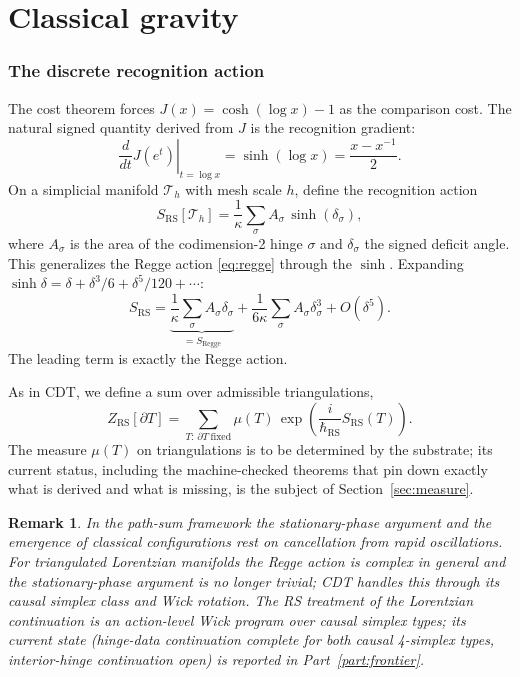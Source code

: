 \documentclass[11pt,letterpaper]{article}
\newtheorem{remark}[theorem]{Remark}
\begin{document}
\part{Classical gravity}
\label{part:classical}

\section{The discrete recognition action}
\label{sec:action}

The cost theorem forces $J(x)=\cosh(\log x)-1$ as the comparison cost. The natural signed quantity derived from $J$ is the recognition gradient:
\begin{equation}
\left.\frac{d}{dt}J(e^{t})\right|_{t=\log x}=\sinh(\log x)=\frac{x-x^{-1}}{2}.
\label{eq:gradient}
\end{equation}
On a simplicial manifold $\mathcal{T}_{h}$ with mesh scale $h$, define the recognition action
\begin{equation}
S_{\mathrm{RS}}[\mathcal{T}_{h}]=\frac{1}{\kappa}\sum_{\sigma}A_{\sigma}\,\sinh(\delta_{\sigma}),
\label{eq:rsaction}
\end{equation}
where $A_{\sigma}$ is the area of the codimension-2 hinge $\sigma$ and $\delta_{\sigma}$ the signed deficit angle. This generalizes the Regge action \eqref{eq:regge} through the $\sinh$. Expanding $\sinh\delta=\delta+\delta^{3}/6+\delta^{5}/120+\cdots$:
\begin{equation}
S_{\mathrm{RS}}=\underbrace{\frac{1}{\kappa}\sum_{\sigma}A_{\sigma}\delta_{\sigma}}_{=S_{\mathrm{Regge}}}+\frac{1}{6\kappa}\sum_{\sigma}A_{\sigma}\delta_{\sigma}^{3}+O(\delta^{5}).
\label{eq:sinhexp}
\end{equation}
The leading term is exactly the Regge action.

As in CDT, we define a sum over admissible triangulations,
\begin{equation}
Z_{\mathrm{RS}}[\partial T]=\sum_{T:\,\partial T\ \text{fixed}}\mu(T)\,\exp\!\left(\frac{i}{\hbar_{\mathrm{RS}}}S_{\mathrm{RS}}(T)\right).
\label{eq:pathsum}
\end{equation}
The measure $\mu(T)$ on triangulations is to be determined by the substrate; its current status, including the machine-checked theorems that pin down exactly what is derived and what is missing, is the subject of Section~\ref{sec:measure}.

\begin{remark}
In the path-sum framework the stationary-phase argument and the emergence of classical configurations rest on cancellation from rapid oscillations. For triangulated Lorentzian manifolds the Regge action is complex in general and the stationary-phase argument is no longer trivial; CDT handles this through its causal simplex class and Wick rotation. The RS treatment of the Lorentzian continuation is an action-level Wick program over causal simplex types; its current state (hinge-data continuation complete for both causal 4-simplex types, interior-hinge continuation open) is reported in Part~\ref{part:frontier}.
\end{remark}
\end{document}
